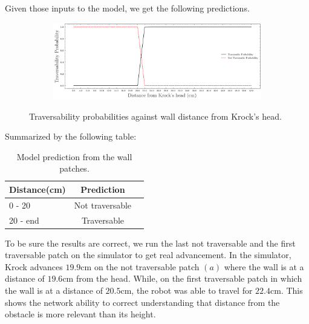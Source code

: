Given those inputs to the model, we get the following predictions.
\begin{figure}[H]
    \centering
\begin{subfigure}[b]{1\textwidth}
    \includegraphics[width=\linewidth]{../img/5/custom_patches/walls_front/predictions.png}
    \end{subfigure}
    \caption{Traversability probabilities against wall distance from Krock's head.}
\end{figure}
Summarized by the following table:
\begin{table}[H]
    \centering
    \begin{tabular}{l|cc}
        Distance(cm) & Prediction \\ 
        \hline
        0 - 20  & Not traversable \\ 
        20 - end & Traversable \\ 
        \hline
    \end{tabular}
    \caption{Model prediction from the wall patches.}
\end{table}
To be sure the results are correct, we run the last not traversable  and the first traversable patch on the simulator to get real advancement. In the simulator, Krock advances $19.9$cm on the not traversable patch $(a)$ where the wall is at a distance of $19.6$cm from the head. While, on the first traversable patch in which the wall is at a distance of $20.5$cm, the robot was able to travel for $22.4$cm. This shows the network ability to correct understanding that distance from the obstacle is more relevant than its height.
